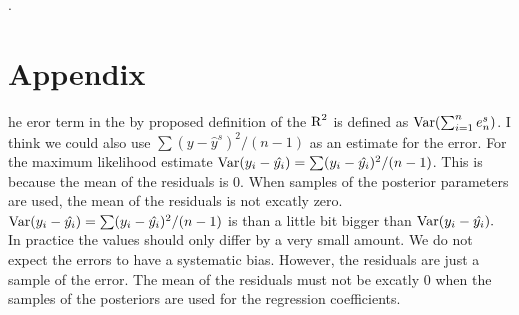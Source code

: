 \documentclass[11pt,a4paper,twoside]{book}\usepackage[]{graphicx}\usepackage[]{color}
\begin{document}
 


. 








\chapter{Appendix}

he eror term in the by \cite{Gelman2017} proposed definition of the $\text{R}^2$ is defined as $\operatorname{Var}(\sum_{i=1}^{n}e^s_{n})$. I think we could also use $ \sum(y - \hat{y}^s)^2/(n-1) $ as an estimate for the error. For the maximum likelihood estimate $\operatorname{Var}(y_{i} - \hat{y_{i}}) = \sum (y_{i} - \hat{y_{i}})^2/ (n-1) $. This is because the mean of the residuals is 0. When  samples of the posterior parameters are used, the mean of the residuals is not excatly zero. $\operatorname{Var}(y_{i} - \hat{y_{i}}) = \sum (y_{i} - \hat{y_{i}})^2/ (n-1) $ is than a little bit bigger than $\operatorname{Var}(y_{i} - \hat{y_{i}}). $ In practice the values should only differ by a very small amount. We do not expect the errors to have a systematic bias. However, the residuals are just a sample of the error. The mean of the residuals must not be excatly 0 when the samples of the posteriors are used for the regression coefficients.   




\cleardoublepage
{}
{}


 


\cleardoublepage
\end{document}
